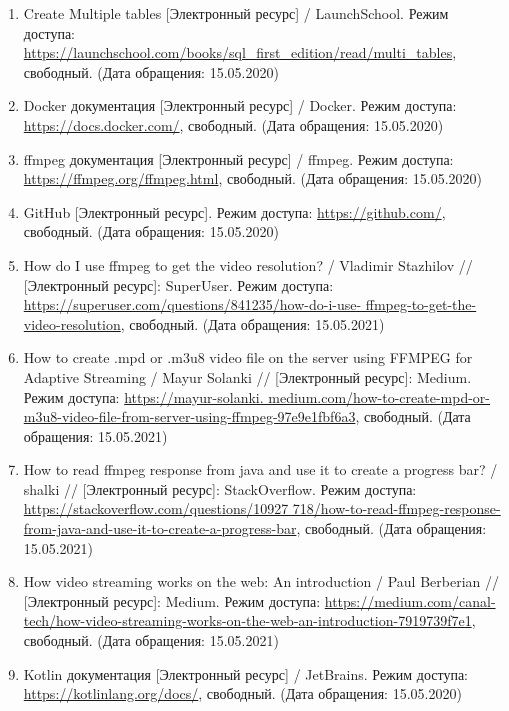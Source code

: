 \documentclass{../includes/TechDoc}
\begin{document}
\begin{enumerate}
        \item Create Multiple tables [Электронный ресурс] / LaunchSchool. Режим доступа: \url{https://launchschool.com/books/sql_first_edition/read/multi_tables}, свободный. (Дата обращения: 15.05.2020)
        \item Docker документация [Электронный ресурс] / Docker. Режим доступа: \url{https://docs.docker.com/}, свободный. (Дата обращения: 15.05.2020)
        \item ffmpeg документация [Электронный ресурс] / ffmpeg. Режим доступа: \url{https://ffmpeg.org/ffmpeg.html}, свободный. (Дата обращения: 15.05.2020)
        \item GitHub [Электронный ресурс]. Режим доступа: \url{https://github.com/}, свободный. (Дата обращения: 15.05.2020)
        \item How do I use ffmpeg to get the video resolution? / Vladimir Stazhilov // [Электронный ресурс]: SuperUser. Режим доступа: \href{https://superuser.com/questions/841235/how-do-i-use-ffmpeg-to-get-the-video-resolution}{https://superuser.com/questions/841235/how-do-i-use- ffmpeg-to-get-the-video-resolution}, свободный. (Дата обращения: 15.05.2021)
        \item How to create .mpd or .m3u8 video file on the server using FFMPEG for Adaptive Streaming / Mayur Solanki // [Электронный ресурс]: Medium. Режим доступа: \href{https://mayur-solanki.medium.com/how-to-create-mpd-or-m3u8-video-file-from-server-using-ffmpeg-97e9e1fbf6a3}{https://mayur-solanki. medium.com/how-to-create-mpd-or-m3u8-video-file-from-server-using-ffmpeg-97e9e1fbf6a3}, свободный. (Дата обращения: 15.05.2021)
        \item How to read ffmpeg response from java and use it to create a progress bar? / shalki // [Электронный ресурс]: StackOverflow. Режим доступа: \href{https://stackoverflow.com/questions/10927718/how-to-read-ffmpeg-response-from-java-and-use-it-to-create-a-progress-bar}{https://stackoverflow.com/questions/10927 718/how-to-read-ffmpeg-response-from-java-and-use-it-to-create-a-progress-bar}, свободный. (Дата обращения: 15.05.2021)
        \item How video streaming works on the web: An introduction / Paul Berberian // [Электронный ресурс]: Medium. Режим доступа: \href{https://medium.com/canal-tech/how-video-streaming-works-on-the-web-an-introduction-7919739f7e1}{https://medium.com/canal-tech/how-video-streaming-works-on-the-web-an-introduction-7919739f7e1}, свободный. (Дата обращения: 15.05.2021)
        \item Kotlin документация [Электронный ресурс] / JetBrains. Режим доступа: \url{https://kotlinlang.org/docs/}, свободный. (Дата обращения: 15.05.2020)

\end{enumerate}
\end{document}
